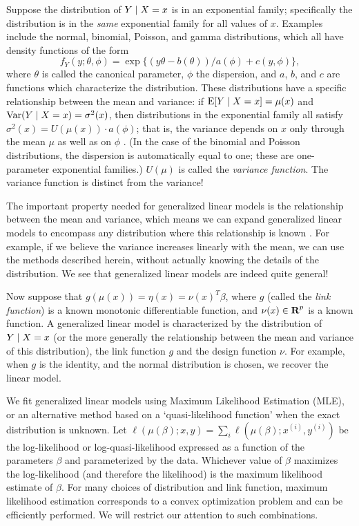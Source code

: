 \documentclass[12pt]{article}
\DeclareMathOperator{\Exp}{\operatorname{E}}
\DeclareMathOperator{\Var}{\operatorname{Var}}
\begin{document}
Suppose the distribution of $Y \; | \; X = x$ is in an exponential family; specifically the distribution is in the \emph{same} exponential family for all values of $x$. Examples include the normal, binomial, Poisson, and gamma distributions, which all have density functions of the form
\begin{displaymath}
   f_Y(y; \theta, \phi) = \exp\{ (y \theta - b(\theta)) / a(\phi) + c(y, \phi) \},
\end{displaymath}
where $\theta$ is called the canonical parameter, $\phi$ the dispersion, and $a$, $b$, and $c$ are functions which characterize the distribution. These distributions have a specific relationship between the mean and variance: if $\Exp [Y \given X = x] = \mu(x)$ and $\Var(Y \given X = x) = \sigma^2 (x)$, then distributions in the exponential family all satisfy $\sigma^2(x) = U(\mu(x)) \cdot a(\phi)$; that is, the variance depends on $x$ only through the mean $\mu$ as well as on $\phi$ \cite[\S 2.2.2]{MN:1983}. (In the case of the binomial and Poisson distributions, the dispersion is automatically equal to one; these are one-parameter exponential families.) $U(\mu)$ is called the \emph{variance function}. The variance function is distinct from the variance!

The important property needed for generalized linear models is the relationship between the mean and variance, which means we can expand generalized linear models to encompass any distribution where this relationship is known \cite[\S 9]{MN:1983}. For example, if we believe the variance increases linearly with the mean, we can use the methods described herein, without actually knowing the details of the distribution. We see that generalized linear models are indeed quite general!

Now suppose that $g(\mu(x)) = \eta(x) = \nu(x)^T \beta$, where $g$ (called the \emph{link function}) is a known monotonic differentiable function, and $\nu(x) \in {\mbox{\bf R}}^p$ is a known function. A generalized linear model is characterized by the distribution of $Y \; | \; X = x$ (or the more generally the relationship between the mean and variance of this distribution), the link function $g$ and the design function $\nu$. For example, when $g$ is the identity, and the normal distribution is chosen, we recover the linear model.

We fit generalized linear models using Maximum Likelihood Estimation (MLE), or an alternative method based on a `quasi-likelihood function' when the exact distribution is unknown. Let $\ell(\mu(\beta); x, y) = \sum_i \ell(\mu(\beta); x^{(i)}, y^{(i)})$ be the log-likelihood or log-quasi-likelihood expressed as a function of the parameters $\beta$ and parameterized by the data. Whichever value of $\beta$ maximizes the log-likelihood (and therefore the likelihood) is the maximum likelihood estimate of $\beta$. For many choices of distribution and link function, maximum likelihood estimation corresponds to a convex optimization problem and can be efficiently performed. We will restrict our attention to such combinations.
\end{document}

